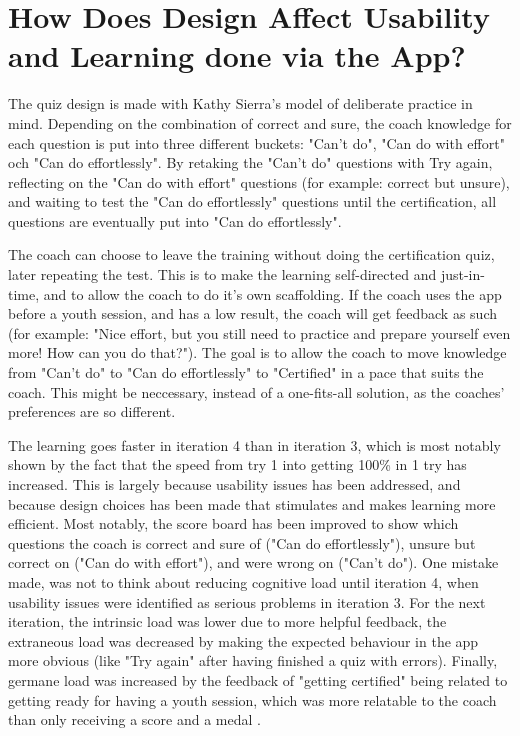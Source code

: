 
\section{How Does Design Affect Usability and Learning done via the App?}

  The quiz design is made with Kathy Sierra's model of deliberate practice in mind. \cite{sierra} Depending on the combination of correct and sure, the coach knowledge for each question is put into three different buckets: "Can't do", "Can do with effort" och "Can do effortlessly". By retaking the "Can't do" questions with Try again, reflecting on the "Can do with effort" questions (for example: correct but unsure), and waiting to test the "Can do effortlessly" questions until the certification, all questions are eventually put into "Can do effortlessly".

  The coach can choose to leave the training without doing the certification quiz, later repeating the test. This is to make the learning self-directed and just-in-time, and to allow the coach to do it's own scaffolding. If the coach uses the app before a youth session, and has a low result, the coach will get feedback as such (for example: "Nice effort, but you still need to practice and prepare yourself even more! How can you do that?"). The goal is to allow the coach to move knowledge from "Can't do" to "Can do effortlessly" to "Certified" in a pace that suits the coach. This might be neccessary, instead of a one-fits-all solution, as the coaches' preferences are so different.

  The learning goes faster in iteration 4 than in iteration 3, which is most notably shown by the fact that the speed from try 1 into getting 100\% in 1 try has increased. This is largely because usability issues has been addressed, and because design choices has been made that stimulates and makes learning more efficient. Most notably, the score board has been improved to show which questions the coach is correct and sure of ("Can do effortlessly"), unsure but correct on ("Can do with effort"), and were wrong on ("Can't do"). One mistake made, was not to think about reducing cognitive load \citep{sweller} until iteration 4, when usability issues were identified as serious problems in iteration 3. For the next iteration, the intrinsic load was lower due to more helpful feedback, the extraneous load was decreased by making the expected behaviour in the app more obvious (like "Try again" after having finished a quiz with errors). Finally, germane load was increased by the feedback of "getting certified" being related to getting ready for having a youth session, which was more relatable to the coach than only receiving a score and a medal \citep{sierra}.

